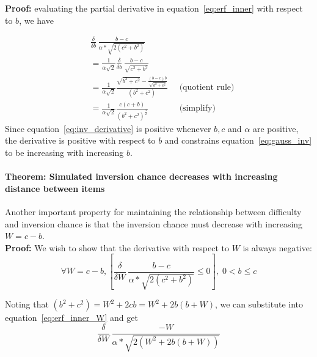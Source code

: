 \documentclass[aps,pre,groupedaddress]{revtex4-2}
\begin{document}
\textbf{Proof:} evaluating the partial derivative in equation~\ref{eq:erf_inner} with respect to $b$, we have

\begin{align}
& \frac{\delta}{\delta b}\, \frac{b - c }{\alpha*\sqrt{2(c^2+b^2)}}& \nonumber\\
& = \frac{1}{\alpha\sqrt{2}} \frac{\delta}{\delta b}\, \frac{b - c }{\sqrt{c^2+b^2}}& \nonumber\\
& = \frac{1}{\alpha\sqrt{2}} \frac{\sqrt{b^2+c^2} - \frac{(b-c)b}{\sqrt{b^2+c^2}}}{(b^2+c^2)}\;\; & \text{(quotient rule)} \nonumber\\
& = \frac{1}{\alpha\sqrt{2}}\frac{c(c+b)}{(b^2+c^2)^{\frac{3}{2}}}\;\; & \text{(simplify)}
\label{eq:inv_derivative}
\end{align}
Since equation~\ref{eq:inv_derivative} is positive whenever $b, c$ and $\alpha$ are positive, the derivative is positive with respect to $b$ and constrains equation~\ref{eq:gauss_inv} to be increasing with increasing $b$. 

\paragraph{\textbf{Theorem:} Simulated inversion chance decreases with increasing distance between items}
Another important property for maintaining the relationship between difficulty and inversion chance is that the inversion chance must decrease with increasing $W = c-b$.\\
\textbf{Proof:} We wish to show that the derivative with respect to $W$ is always negative:
\begin{equation}
\forall W = c-b, \left[ \frac{\delta}{\delta W}\, \frac{b - c }{\alpha*\sqrt{2(c^2+b^2)}} \leq 0\right] ,\;  0 < b \leq c
\label{eq:erf_inner_W}
\end{equation}

Noting that $(b^2 + c^2) = W^2 + 2cb = W^2 + 2b(b+W)$, we can substitute into equation~\ref{eq:erf_inner_W} and get
\begin{equation}
    \frac{\delta}{\delta W}\, \frac{-W}{\alpha*\sqrt{2(W^2 + 2b(b+W))}}
\label{eq:inv_derivative_subW}
\end{equation}
\end{document}
